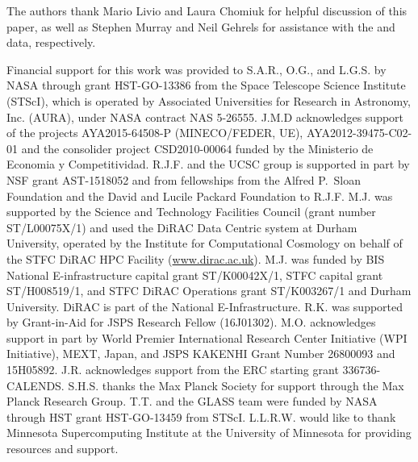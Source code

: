 
\begin{acknowledgments}
The authors thank Mario Livio and Laura Chomiuk for helpful discussion
of this paper, as well as Stephen Murray and Neil Gehrels for
assistance with the \Chandra and \SWIFT data, respectively.

Financial support for this work was provided to S.A.R., O.G., and L.G.S. by NASA
through grant HST-GO-13386 from the Space Telescope Science Institute
(STScI), which is operated by Associated Universities for Research in
Astronomy, Inc. (AURA), under NASA contract NAS 5-26555.
J.M.D acknowledges support of the
projects AYA2015-64508-P (MINECO/FEDER, UE), AYA2012-39475-C02-01 and
the consolider project CSD2010-00064 funded by the Ministerio de
Economia y Competitividad.
R.J.F. and the UCSC group is supported in part by NSF grant
AST-1518052 and from fellowships from the Alfred P.\ Sloan Foundation
and the David and Lucile Packard Foundation to R.J.F.
M.J. was supported by the Science and
Technology Facilities Council (grant number ST/L00075X/1) and used the
DiRAC Data Centric system at Durham University, operated by the
Institute for Computational Cosmology on behalf of the STFC DiRAC HPC
Facility (\url{www.dirac.ac.uk}).  M.J. was funded by BIS National
E-infrastructure capital grant ST/K00042X/1, STFC capital grant
ST/H008519/1, and STFC DiRAC Operations grant ST/K003267/1 and Durham
University. DiRAC is part of the National E-Infrastructure.
R.K. was supported by Grant-in-Aid for JSPS Research Fellow (16J01302).
M.O.  acknowledges support in part by World Premier International
Research Center Initiative (WPI Initiative), MEXT, Japan, and JSPS
KAKENHI Grant Number 26800093 and 15H05892.
J.R. acknowledges support from the ERC starting grant
336736-CALENDS.
S.H.S. thanks the Max Planck Society for support through the Max Planck
Research Group.
T.T. and the GLASS team were funded by NASA through HST grant
HST-GO-13459 from STScI.
L.L.R.W. would like to thank Minnesota Supercomputing Institute at
the University of Minnesota for providing resources and support.


\end{acknowledgments}
